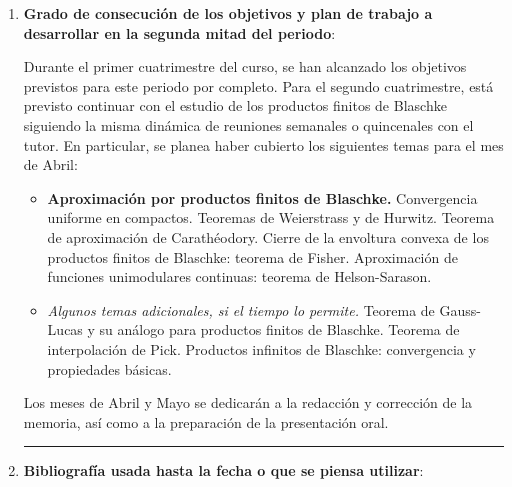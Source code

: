 \documentclass[a4paper,oneside,11pt,leqno]{article}
\begin{document}
\begin{enumerate}[label=\textbf{\arabic*.}]

\vskip 20pt
\hrule
\item {\bf Grado de consecuci\'on de los objetivos y plan de trabajo a desarrollar en la segunda mitad del periodo}: 

Durante el primer cuatrimestre del curso, se han alcanzado los objetivos previstos para este periodo por completo. Para el segundo cuatrimestre, est\'a previsto continuar con el estudio de los productos finitos de Blaschke siguiendo la misma din\'amica de reuniones semanales o quincenales con el tutor. En particular, se planea haber cubierto los siguientes temas para el mes de Abril:

\begin{itemize}
    \item \textbf{Aproximaci\'on por productos finitos de Blaschke.} Convergencia uniforme en compactos. Teoremas de Weierstrass y de Hurwitz. Teorema de aproximaci\'on de Carath\'eodory. Cierre de la envoltura convexa de los productos finitos de Blaschke: teorema de Fisher. Aproximaci\'on de funciones unimodulares continuas: teorema de Helson-Sarason.
    
    \item \textit{Algunos temas adicionales, si el tiempo lo permite.} Teorema de Gauss-Lucas y su an\'alogo para productos finitos de Blaschke. Teorema de interpolaci\'on de Pick. Productos infinitos de Blaschke: convergencia y propiedades b\'asicas.
\end{itemize}

Los meses de Abril y Mayo se dedicar\'an a la redacci\'on y correcci\'on de la memoria, as\'i como a la preparaci\'on de la presentaci\'on oral.

\vskip 20pt 
\hrule

\item {\bf Bibliograf\'ia usada hasta la fecha o que se piensa utilizar}: \\

\vspace{-15pt}

\printbibliography[heading=none]






\end{enumerate}
\end{document}
